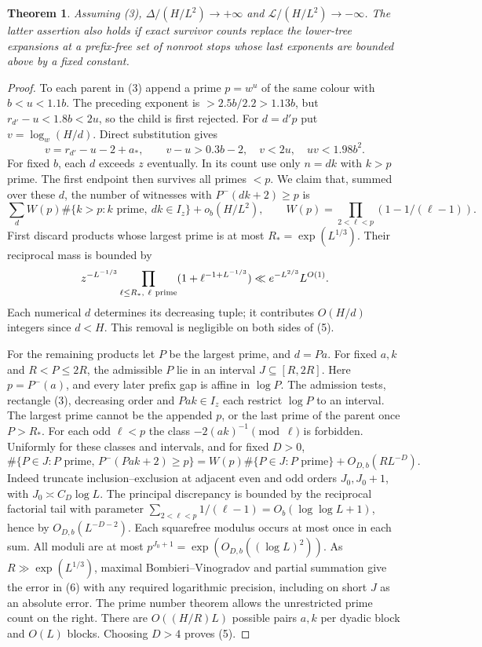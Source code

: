 \documentclass[11pt]{article}
\newtheorem{theorem}{Theorem}
\begin{document}
\begin{theorem}\label{main}Assuming (3), $\Delta/(H/L^2)\to+\infty$ and $\mathcal L/(H/L^2)\to-\infty$. The latter assertion also holds if exact survivor counts replace the lower-tree expansions at a prefix-free set of nonroot stops whose last exponents are bounded above by a fixed constant.
\end{theorem}
\begin{proof}
To each parent in (3) append a prime $p=w^u$ of the same colour with $b<u<1.1b$. The preceding exponent is $>2.5b/2.2>1.13b$, but $r_{d'}-u<1.8b<2u$, so the child is first rejected. For $d=d'p$ put $v=\log_w(H/d)$. Direct substitution gives
\[
 v=r_{d'}-u-2+a_*,\qquad v-u>0.3b-2,\quad v<2u,\quad uv<1.98b^2. \tag{4}
\]
For fixed $b$, each $d$ exceeds $z$ eventually. In its count use only $n=dk$ with $k>p$ prime. The first endpoint then survives all primes $<p$. We claim that, summed over these $d$, the number of witnesses with $P^-(dk+2)\ge p$ is
\[
 \sum_d W(p)\#\{k>p:k\text{ prime},\ dk\in I_z\}+o_b(H/L^2),
 \qquad W(p)=\prod_{2<\ell<p}(1-1/(\ell-1)).                  \tag{5}
\]
First discard products whose largest prime is at most $R_*=\exp(L^{1/3})$. Their reciprocal mass is bounded by
\[
 z^{-L^{-1/3}}\prod_{\ell\le R_*,\ \ell\ {\rm prime}}
       (1+\ell^{-1+L^{-1/3}})\ll e^{-L^{2/3}} L^{O(1)} .
\]
Each numerical $d$ determines its decreasing tuple; it contributes $O(H/d)$ integers since $d<H$. This removal is negligible on both sides of (5).

For the remaining products let $P$ be the largest prime, and $d=Pa$. For fixed $a,k$ and $R<P\le2R$, the admissible $P$ lie in an interval $J\subseteq[R,2R]$. Here $p=P^-(a)$, and every later prefix gap is affine in $\log P$. The admission tests, rectangle (3), decreasing order and $Pak\in I_z$ each restrict $\log P$ to an interval. The largest prime cannot be the appended $p$, or the last prime of the parent once $P>R_*$. For each odd $\ell<p$ the class $-2(ak)^{-1}\pmod\ell$ is forbidden. Uniformly for these classes and intervals, and for fixed $D>0$,
\[
 \#\{P\in J:P\text{ prime},\,P^-(Pak+2)\ge p\}
 =W(p)\#\{P\in J:P\text{ prime}\}+O_{D,b}(RL^{-D}).           \tag{6}
\]
Indeed truncate inclusion--exclusion at adjacent even and odd orders $J_0,J_0+1$, with $J_0\asymp C_D\log L$. The principal discrepancy is bounded by the reciprocal factorial tail with parameter $\sum_{2<\ell<p}1/(\ell-1)=O_b(\log\log L+1)$, hence by $O_{D,b}(L^{-D-2})$. Each squarefree modulus occurs at most once in each sum. All moduli are at most $p^{J_0+1}=\exp(O_{D,b}((\log L)^2))$. As $R\gg\exp(L^{1/3})$, maximal Bombieri--Vinogradov and partial summation give the error in (6) with any required logarithmic precision, including on short $J$ as an absolute error. The prime number theorem allows the unrestricted prime count on the right. There are $O((H/R)L)$ possible pairs $a,k$ per dyadic block and $O(L)$ blocks. Choosing $D>4$ proves (5).


\end{proof}
\end{document}
